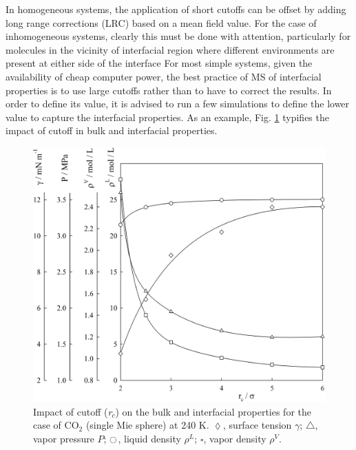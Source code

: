 \documentclass[9pt,bestpractices]{livecoms}
\begin{document}
In homogeneous systems, the application of short cutoffs can be offset by
adding long range corrections (LRC) based on a mean field value. For the case
of inhomogeneous systems, clearly this must be done with attention,
particularly for molecules in the vicinity of interfacial region where
different environments are present at either side of the interface
\citep{lotfi1990,janecek2006,siperstein2002,lishchuk2018}
For most simple systems, given the
availability of cheap computer power, the best practice of MS of interfacial
properties is to use large cutoffs rather than to have to correct the results. In
order to define its value, it is advised to run a few simulations to define the
lower value to capture the interfacial properties. As an example, Fig. \ref{fig:11}
typifies the impact of cutoff in bulk and interfacial properties. 

\begin{figure}
  \centering
\includegraphics[width=\linewidth]{gfx/fig_11_op4.JPG}
\caption{Impact of cutoff (\textit{r}$_{c}$) on the bulk and interfacial properties for the case of CO$_{2}$ (single Mie sphere) at 240 K. $\lozenge$, surface tension $\gamma$; $\triangle$, vapor pressure $P$; $\ocircle$, liquid density $\rho^L$; $\square$, vapor density $\rho^V$.}
\label{fig:11}
\end{figure}
\end{document}
